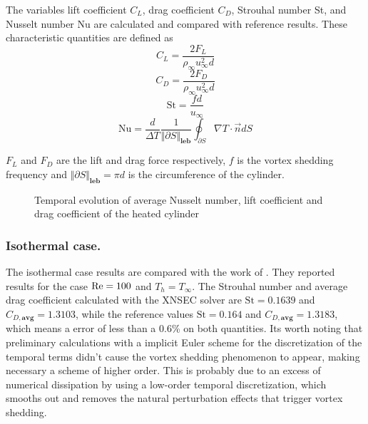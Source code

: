 The variables lift coefficient $C_L$, drag coefficient $C_D$, Strouhal number St, and Nusselt number Nu are calculated and compared with reference results. These characteristic quantities are defined as
\begin{equation} 
	C_L = \frac{2F_L}{\rho_\infty u^2_\infty d}
\end{equation}
\begin{equation}
	C_D = \frac{2F_D}{\rho_\infty u^2_\infty d}
\end{equation}
\begin{equation}
	\text{St} = \frac{fd}{u_\infty}
\end{equation}
\begin{equation}
	\text{Nu} = \frac{d}{\Delta T}\frac{1}{\Vert \partial S\Vert_{\textbf{leb}}}\oint_{\partial S} \nabla T \cdot \vec{n} dS
\end{equation}

$F_L$ and $F_D$ are the lift and drag force respectively, $f$ is the vortex shedding frequency and ${\Vert \partial S\Vert_{\textbf{leb}}}= \pi d$ is the circumference of the cylinder.
\begin{figure}[t]
	\centering	
	\caption{Temporal evolution of average Nusselt number, lift coefficient and drag coefficient of the heated cylinder}	\label{fig:HeatedCylinderResults}
\end{figure}
\subsubsection{Isothermal case.}
The isothermal case results are compared with the work of \textcite{sharmaHeatFluidFlow2004}. They reported results for the case $\text{Re} = 100$ and $T_h = T_\infty$. The Strouhal number and average drag coefficient calculated with the XNSEC solver are $\text{St} = 0.1639$ and $C_{D,\textbf{avg}} = 1.3103$, while the reference values $\text{St} = 0.164$ and $C_{D,\textbf{avg}} = 1.3183$, which means a error of less than a 0.6\% on both quantities. Its worth noting that preliminary calculations with a implicit Euler scheme for the discretization of the temporal terms didn't cause the vortex shedding phenomenon to appear, making necessary a scheme of higher order. This is probably due to an excess of numerical dissipation by using a low-order temporal discretization, which smooths out and removes the natural perturbation effects that trigger vortex shedding.
